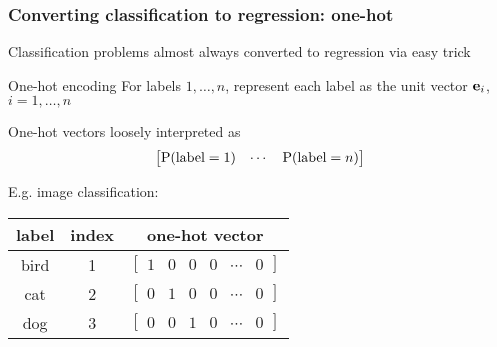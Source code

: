 \begin{frame}
    \frametitle{Converting classification to regression: one-hot}

    Classification problems almost always converted to regression via easy trick

    \begin{block}{One-hot encoding}
        For labels $1, \dots, n$, represent each label as the unit vector $\mathbf{e}_i$, $i = 1, \dots, n$ \\[1ex]
    \end{block}
    \pause

    One-hot vectors loosely interpreted as
    \begin{equation*}
        \begin{bmatrix}
            \operatorname{\mathrm{P}}(\text{label} = 1) & \cdots & \operatorname{\mathrm{P}}(\text{label} = n)
        \end{bmatrix}
    \end{equation*}

    E.g. image classification: \\[0.5ex]

    \centering
    \begin{tabular}{c|cc}
        label & index & one-hot vector \\
        \hline
        bird & 1 & $\begin{bmatrix} 1 & 0 & 0 & 0 & \cdots & 0 \end{bmatrix}$ \\
        cat & 2 & $\begin{bmatrix} 0 & 1 & 0 & 0 & \cdots & 0 \end{bmatrix}$ \\
        dog & 3 & $\begin{bmatrix} 0 & 0 & 1 & 0 & \cdots & 0 \end{bmatrix}$ \\
    \end{tabular}
\end{frame}

